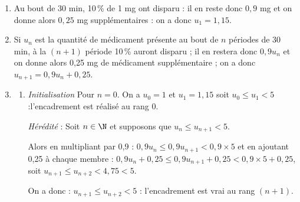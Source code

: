 \begin{enumerate}
\item %
Au bout de 30 min, 10\,\% de 1 mg ont disparu : il en reste donc $0,9$ mg et on donne alors $0,25$ mg supplémentaires : on a donc $u_1 = 1,15$.
\item %

Si $u_n$ est la quantité de médicament présente au bout de $n$ périodes de 30 min, à la $(n + 1)$ période 10\,\% auront disparu ; il en restera donc $0,9u_n$ et on donne alors 0,25 mg de médicament supplémentaire ; on a donc $u_{n+1} = 0,9u_n + 0,25$.
\item 
	\begin{enumerate}
		\item %
		\emph{Initialisation} Pour $n = 0$.
On a $u_0 = 1$ et $u_1 = 1,15$  soit $u_0 \leqslant u_1 < 5$ :l'encadrement est réalisé au rang $0$.

\emph{Hérédité} : Soit $n \in \N$ et supposons que $u_n \leqslant  u_{n+1} < 5$.

Alors en multipliant par 0,9 : $0,9u_n \leqslant 0,9u_{n+1} < 0,9 \times 5$ et en ajoutant 0,25 à chaque membre : $0,9u_n + 0,25 \leqslant 0,9u_{n+1} + 0,25  < 0,9 \times 5 + 0,25$, soit $u_{n+1} \leqslant u_{n+2} < 4,75 < 5$.

On a donc : $u_{n+1} \leqslant u_{n+2} <  5$ : l'encadrement est vrai au rang $(n + 1)$.


\end{enumerate}
\end{enumerate}
